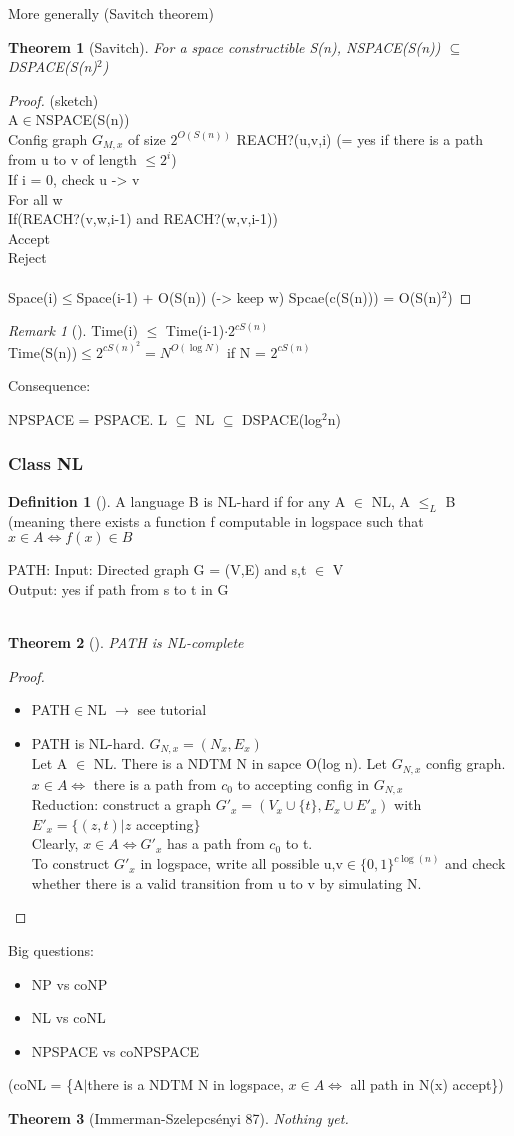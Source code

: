 \documentclass{article}
\newtheorem{theorem}{Theorem}
\theoremstyle{definition}
\newtheorem{definition}{Definition}
\theoremstyle{remark}
\newtheorem*{remark}{Remark}
\newcommand{\Thm}[3]{\begin{theorem}[#1]\label{#2}#3\end{theorem}}
\newcommand{\Def}[3]{\begin{definition}[#1]\label{#2}#3\end{definition}}
\newcommand{\Rem}[3]{\begin{remark}[#1]\label{#2}#3\end{remark}}
\newcommand{\Proof}[1]{\begin{proof}#1\end{proof}}
\begin{document}
More generally (Savitch theorem)
\Thm{Savitch}{}{For a space constructible S(n), NSPACE(S(n)) $\subseteq$ DSPACE(S(n)$^2$)}
\Proof{(sketch)\\
	A$\in$NSPACE(S(n))\\
	Config graph $G_{M,x}$ of size $2^{O(S(n))}$
	REACH?(u,v,i) (= yes if there is a path from u to v of length $\leq 2^i$)\\
		If i = 0, check u -> v\\
		For all w\\
			If(REACH?(v,w,i-1) and REACH?(w,v,i-1))\\
				Accept\\
		Reject\\\\
Space(i)$\leq$Space(i-1) + O(S(n)) (-> keep w)
Spcae(c(S(n))) = O(S(n)$^2$)
	}
	
\Rem{}{}{Time(i) $\leq$ Time(i-1)$\cdot2^{cS(n)}$\\
	Time(S(n))$\leq 2^{cS(n)^2} = N^{O(\log N)}$ if N = $2^{cS(n)}$}
	
Consequence:

NPSPACE = PSPACE. L $\subseteq$ NL $\subseteq$ DSPACE(log$^2$n)

\subsubsection{Class NL}
\Def{}{}{A language B is NL-hard if for any A $\in$ NL, A $\leq_L$ B (meaning there exists a function f computable in logspace such that $x\in A \Leftrightarrow f(x)\in B$}

PATH: Input: Directed graph G = (V,E) and s,t $\in$ V\\
Output: yes if path from s to t in G\\\\

\Thm{}{}{PATH is NL-complete}
\Proof{\begin{itemize}
		\item PATH$\in$NL $\rightarrow$ see tutorial
		\item PATH is NL-hard. $G_{N,x} = (N_x,E_x)$\\
		Let A $\in$ NL. There is a NDTM N in sapce O(log n). Let $G_{N,x}$ config graph. $x\in A \Leftrightarrow$ there is a path from $c_0$ to accepting config in $G_{N,x}$\\
		Reduction: construct a graph $G'_x = (V_x\cup\{t\},E_x\cup E'_x)$ with $E'_x = \{(z,t)|z$ accepting$\}$\\
		Clearly, $x\in A \Leftrightarrow G'_x$ has a path from $c_0$ to t.\\
		To construct $G'_x$ in logspace, write all possible u,v$\in \{0,1\}^{c\log(n)}$ and check whether there is a valid transition from u to v by simulating N.
	\end{itemize}}

Big questions: \begin{itemize}
	\item NP vs coNP
	\item NL vs coNL
	\item NPSPACE vs coNPSPACE
\end{itemize}
(coNL = \{A$|$there is a NDTM N in logspace, $x\in A \Leftrightarrow$ all path in N(x) accept\})\\

\Thm{Immerman-Szelepcs\'enyi 87}{}{Nothing yet.}
\end{document}
